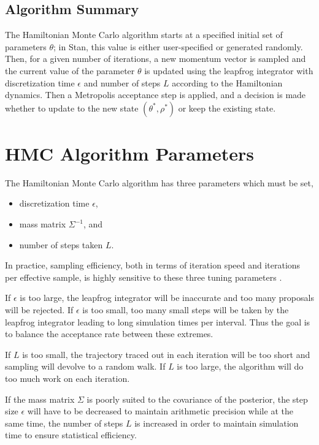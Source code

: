 \subsection{Algorithm Summary}

The Hamiltonian Monte Carlo algorithm starts at a specified initial
set of parameters $\theta$; in Stan, this value is either
user-specified or generated randomly. Then, for a given number of
iterations, a new momentum vector is sampled and the current value of
the parameter $\theta$ is updated using the leapfrog integrator with
discretization time $\epsilon$ and number of steps $L$ according to
the Hamiltonian dynamics. Then a Metropolis acceptance step is
applied, and a decision is made whether to update to the new state
$(\theta^{*},\rho^{*})$ or keep the existing state.


\section{HMC Algorithm Parameters}

The Hamiltonian Monte Carlo algorithm has three parameters which must
be set,
%
\begin{itemize}
\item discretization time $\epsilon$, 
\item mass matrix $\Sigma^{-1}$, and
\item number of steps taken $L$.
\end{itemize}
%
In practice, sampling efficiency, both in terms of iteration speed and
iterations per effective sample, is highly sensitive to these three
tuning parameters \citep{Neal:2011,Hoffman-Gelman:2014}.

If $\epsilon$ is too large, the leapfrog integrator will be inaccurate
and too many proposals will be rejected. If $\epsilon$ is too small,
too many small steps will be taken by the leapfrog integrator leading
to long simulation times per interval. Thus the goal is to balance the
acceptance rate between these extremes. 

If $L$ is too small, the trajectory traced out in each iteration will
be too short and sampling will devolve to a random walk.  If $L$ is
too large, the algorithm will do too much work on each iteration.

If the mass matrix $\Sigma$ is poorly suited to the covariance of the
posterior, the step size $\epsilon$ will have to be decreased to
maintain arithmetic precision while at the same time, the number of
steps $L$ is increased in order to maintain simulation time to ensure
statistical efficiency.


